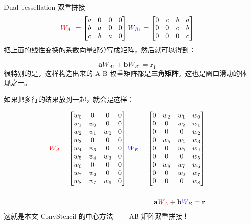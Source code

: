 \documentclass[aspectratio=169,10pt]{beamer}
\begin{document}
\begin{frame}[fragile,shrink=28]{Dual Tessellation	双重拼接}
\[
{\color{red}W_{A1}}= 
\begin{bmatrix}
a & 0 & 0 & 0 \\
b & a & 0 & 0 \\
c & b & a & 0
\end{bmatrix}
{\color{blue}W_{B1}} = 
\begin{bmatrix}
0 & c & b & a \\
0 & 0 & c & b \\
0 & 0 & 0 & c
\end{bmatrix}
\]
把上面的线性变换的系数向量部分写成矩阵，然后就可以得到：
\par
\[
\mathbf aW_{A1}+\mathbf b W_{B1}=\mathbf r_1
\]
很特别的是，这样构造出来的 A B 权重矩阵都是\textbf{三角矩阵}。这也是窗口滑动的体现之一。
\par
如果把多行的结果放到一起，就会是这样：
\par
\[
\begin{aligned}
{\color{red}W_A}= 
\begin{bmatrix}
w_0 & 0 & 0 & 0 \\
w_1 & w_0 & 0 & 0 \\
w_2 & w_1 & w_0 & 0 \\
w_3 & 0 & 0 & 0 \\
w_4 & w_3 & 0 & 0 \\
w_5 & w_4 & w_3 & 0 \\
w_6 & 0 & 0 & 0 \\
w_7 & w_6 & 0 & 0 \\
w_8 & w_7 & w_6 & 0
\end{bmatrix}
{\color{blue}W_B} = 
\begin{bmatrix}
0 & w_2 & w_1 & w_0 \\
0 & 0 & w_2 & w_1 \\
0 & 0 & 0 & w_2 \\
0 & w_5 & w_4 & w_3 \\
0 & 0 & w_5 & w_4 \\
0 & 0 & 0 & w_5 \\
0 & w_8 & w_7 & w_6 \\
0 & 0 & w_8 & w_7 \\
0 & 0 & 0 & w_8
\end{bmatrix}
\\\\
\mathbf a{\color{red}{W_A}}+\mathbf b {\color{blue}{W_B}}=\mathbf r
\end{aligned}
\]
这就是本文 $\text{ConvStencil}$ 的中心方法—— AB 矩阵双重拼接！
\par
\end{frame}
\end{document}
